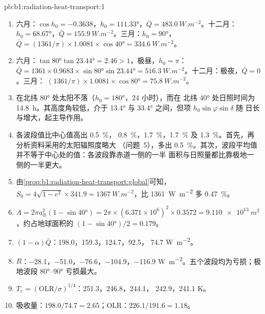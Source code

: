 \begin{solution}{pb:b1:radiation-heat-transport:1}
\begin{enumerate}
  \item 六月：$\cos h_0 = -0.3638$，$h_0 = \ang{111.33}$，$\bar Q =
        \qty{483.0}{W.m^{-2}}$。十二月：$h_0 = \ang{68.67}$，$\bar Q =
        \qty{155.9}{W.m^{-2}}$。三月：$h_0 = \ang{90}$，$\bar Q = (1361/\pi)
        \times 1.0081 \times \cos\ang{40} = \qty{334.6}{W.m^{-2}}$。
  \item 六月：$\tan\ang{80}\tan\ang{23.44} = 2.46 > 1$，极昼，$h_0 = \pi$：
        $\bar Q = 1361 \times 0.9683 \times \sin\ang{80}\sin\ang{23.44} =
        \qty{516.3}{W.m^{-2}}$。十二月：极夜，$\bar Q = 0$。三月：
        $(1361/\pi) \times 1.0081 \times \cos\ang{80} = \qty{75.8}{W.m^{-2}}$。
  \item 在北纬 \ang{80} 处太阳不落（$h_0 = \ang{180}$，24 小时），而在
        北纬 \ang{40} 处日照时间为 \qty{14.8}{h}。其高度角较低，介于
        \ang{13.4} 与 \ang{33.4} 之间，但项 $h_0\sin\varphi\sin\delta$ 随
        日长与增大，起主导作用。
  \item 各波段值比中心值高出 \qty{0.5}{\percent}，
        \qty{0.8}{\percent}，\qty{1.7}{\percent}，\qty{1.7}{\percent} 及
        \qty{1.3}{\percent}。首先，再分析资料采用的太阳辐照度略大
        （问题~5），多出 \qty{0.5}{\percent}。其次，波段平均值
        并不等于中心处的值：各波段靠赤道一侧的一半
        面积与日照量都比靠极地一侧的一半更大。
  \item 由\cref{prop:b1:radiation-heat-transport:global}可知，$S_0 = 4\sqrt{1-e^2}
        \times 341.9 = \qty{1367}{W.m^{-2}}$，比 \qty{1361}{W.m^{-2}} 多 \qty{0.47}{\percent}。
  \item $A = 2\pi a_\oplus^2(1 - \sin\ang{40}) = 2\pi \times (6.371\times10^6)^2
        \times 0.3572 = \qty{9.110e13}{m^2}$，约占地球面积的 $(1 - \sin\ang{40})/2 =
        0.179$。
  \item $(1 - \alpha)\bar Q$：\num{198.0}，\num{159.3}，\num{124.7}，\num{92.5}，
        \num{74.7} \unit{W.m^{-2}}。
  \item $R$：\num{-28.1}，\num{-51.0}，\num{-76.6}，\num{-104.9}，\num{-116.9}
        \unit{W.m^{-2}}。五个波段均为亏损；极地波段
        \ang{80}--\ang{90} 亏损最大。
  \item $T_e = (\text{OLR}/\sigma)^{1/4}$：\num{251.3}，\num{246.8}，\num{244.1}，
        \num{242.9}，\num{241.1} \unit{K}。
  \item 吸收量：$198.0/74.7 = 2.65$；OLR：$226.1/191.6 = 1.18$。

\end{enumerate}
\end{solution}
